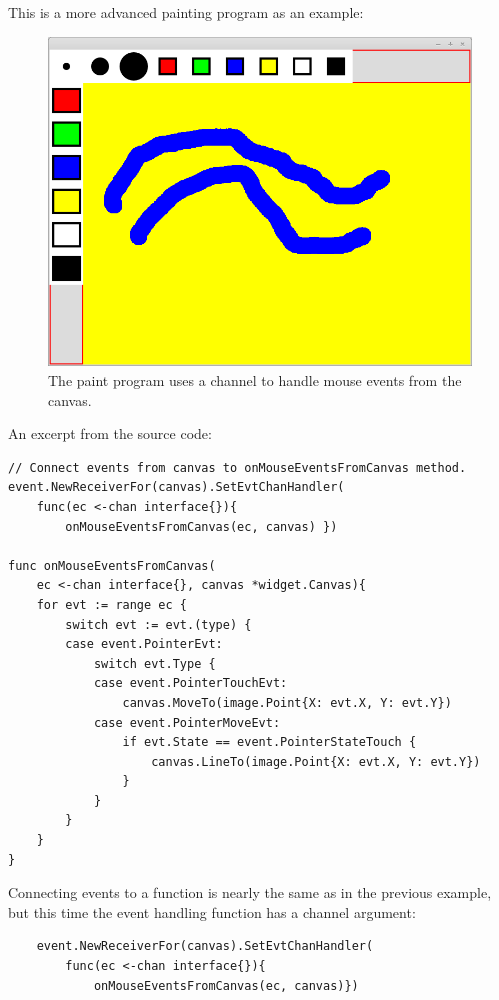 This is a more advanced painting program as an example:

\begin{figure}[ht]
\centering
\includegraphics[width=12cm]{img/paint.png}
\caption{The paint program uses a channel to handle mouse
events from the canvas.}
\end{figure}

An excerpt from the source code:

\begin{verbatim}
// Connect events from canvas to onMouseEventsFromCanvas method.
event.NewReceiverFor(canvas).SetEvtChanHandler(
    func(ec <-chan interface{}){
        onMouseEventsFromCanvas(ec, canvas) })

func onMouseEventsFromCanvas(
    ec <-chan interface{}, canvas *widget.Canvas){
    for evt := range ec {
        switch evt := evt.(type) {
        case event.PointerEvt:
            switch evt.Type {
            case event.PointerTouchEvt:
                canvas.MoveTo(image.Point{X: evt.X, Y: evt.Y})
            case event.PointerMoveEvt:
                if evt.State == event.PointerStateTouch {
                    canvas.LineTo(image.Point{X: evt.X, Y: evt.Y})
                }
            }
        }
    }
}
\end{verbatim}

Connecting events to a function is nearly the same as in the previous
example, but this time the event handling function has a channel
argument:

\begin{verbatim}
    event.NewReceiverFor(canvas).SetEvtChanHandler(
        func(ec <-chan interface{}){
            onMouseEventsFromCanvas(ec, canvas)})
\end{verbatim}

